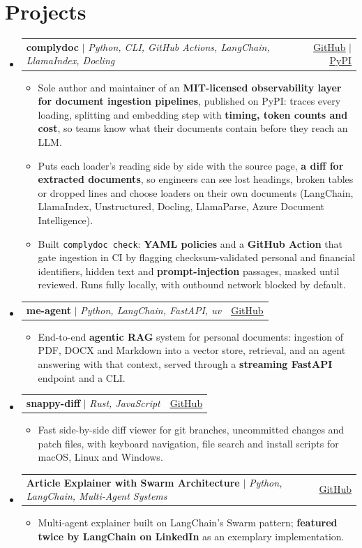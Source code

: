 \documentclass[a4paper,11pt]{article}
\makeatletter
\newcommand{\resumeItem}[1]{
  \item\small{
    {#1 \vspace{-2pt}}
  }
}
\newcommand{\resumeProjectHeading}[2]{
    \item
    \begin{tabular*}{0.97\textwidth}{l@{\extracolsep{\fill}}r}
      \small#1 & #2 \\
    \end{tabular*}\vspace{-7pt}
}
\newcommand{\resumeSubHeadingListStart}{\begin{itemize}[leftmargin=0.15in, label={}]}
\newcommand{\resumeSubHeadingListEnd}{\end{itemize}}
\newcommand{\resumeItemListStart}{\begin{itemize}[itemsep=0pt,topsep=2pt]}
\newcommand{\resumeItemListEnd}{\end{itemize}\vspace{-5pt}}
\makeatother
\begin{document}
\section{Projects}
    \resumeSubHeadingListStart
      \resumeProjectHeading
          {\textbf{complydoc} $|$ \emph{Python, CLI, GitHub Actions, LangChain, LlamaIndex, Docling}}{\href{https://github.com/complydoc/complydoc}{\underline{GitHub}} $|$ \href{https://pypi.org/project/complydoc/}{\underline{PyPI}}}
          \resumeItemListStart
            \resumeItem{Sole author and maintainer of an \textbf{MIT-licensed observability layer for document ingestion pipelines}, published on PyPI: traces every loading, splitting and embedding step with \textbf{timing, token counts and cost}, so teams know what their documents contain before they reach an LLM.}
            \resumeItem{Puts each loader's reading side by side with the source page, \textbf{a diff for extracted documents}, so engineers can see lost headings, broken tables or dropped lines and choose loaders on their own documents (LangChain, LlamaIndex, Unstructured, Docling, LlamaParse, Azure Document Intelligence).}
            \resumeItem{Built \texttt{complydoc check}: \textbf{YAML policies} and a \textbf{GitHub Action} that gate ingestion in CI by flagging checksum-validated personal and financial identifiers, hidden text and \textbf{prompt-injection} passages, masked until reviewed. Runs fully locally, with outbound network blocked by default.}
          \resumeItemListEnd
      \resumeProjectHeading
          {\textbf{me-agent} $|$ \emph{Python, LangChain, FastAPI, uv}}{\href{https://github.com/duartecaldascardoso/me-agent}{\underline{GitHub}}}
          \resumeItemListStart
            \resumeItem{End-to-end \textbf{agentic RAG} system for personal documents: ingestion of PDF, DOCX and Markdown into a vector store, retrieval, and an agent answering with that context, served through a \textbf{streaming FastAPI} endpoint and a CLI.}
          \resumeItemListEnd
      \resumeProjectHeading
          {\textbf{snappy-diff} $|$ \emph{Rust, JavaScript}}{\href{https://github.com/duartecaldascardoso/snappy-diff}{\underline{GitHub}}}
          \resumeItemListStart
            \resumeItem{Fast side-by-side diff viewer for git branches, uncommitted changes and patch files, with keyboard navigation, file search and install scripts for macOS, Linux and Windows.}
          \resumeItemListEnd
      \resumeProjectHeading
          {\textbf{Article Explainer with Swarm Architecture} $|$ \emph{Python, LangChain, Multi-Agent Systems}}{\href{https://github.com/duartecaldascardoso/article-explainer}{\underline{GitHub}}}
          \resumeItemListStart
            \resumeItem{Multi-agent explainer built on LangChain's Swarm pattern; \textbf{featured twice by LangChain on LinkedIn} as an exemplary implementation.}
          \resumeItemListEnd
    \resumeSubHeadingListEnd
\end{document}
